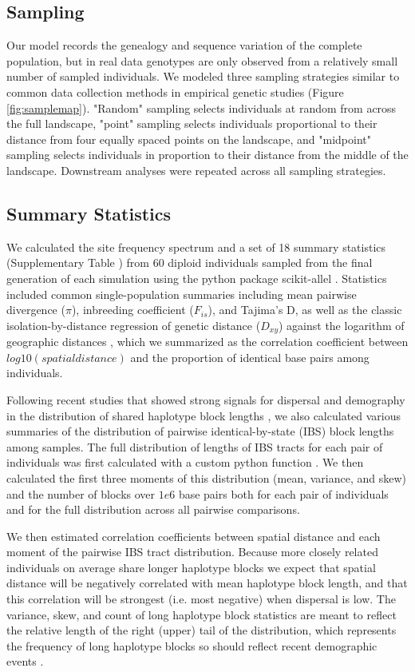 \documentclass[10pt,twoside,lineno]{gsajnl}
\newif\ifcomments
\newcommand{\cjb}[1]{\ifcomments{{\color{blue} \it (#1)}}\else{}\fi}
\newcommand{\ak}[1]{\ifcomments{{\color{red} \it (#1)}}\else{}\fi}
\begin{document}
\subsection{Sampling}
Our model records the genealogy and sequence variation of the complete population, but in real data genotypes are only observed from a relatively small number of sampled individuals. We modeled three sampling strategies similar to common data collection methods in empirical genetic studies (Figure \ref{fig:samplemap}). "Random" sampling selects individuals at random from across the full landscape, "point" sampling selects individuals proportional to their distance from four equally spaced points on the landscape, and "midpoint" sampling selects individuals in proportion to their distance from the middle of the landscape. Downstream analyses were repeated across all sampling strategies. 

\subsection{Summary Statistics}
We calculated the site frequency spectrum and a set of 18 summary statistics (Supplementary Table \cjb{working on this}) from 60 diploid individuals sampled from the final generation of each simulation using the python package scikit-allel \citep{Miles2017}. Statistics included common single-population summaries including mean pairwise divergence ($\pi$), inbreeding coefficient ($F_{is}$), and Tajima's D, as well as the classic isolation-by-distance regression of genetic distance ($D_{xy}$) against the logarithm of geographic distances \citep{Rousset1997}, which we summarized as the correlation coefficient between $log10(spatial distance)$ and the proportion of identical base pairs among individuals. 

Following recent studies that showed strong signals for dispersal and demography in the distribution of shared haplotype block lengths \citep{Ringbauer2017,Baharian2016}, we also calculated various summaries of the distribution of pairwise identical-by-state (IBS) block lengths among samples. The full distribution of lengths of IBS tracts for each pair of individuals was first calculated with a custom python function \ak{point to code on github}. We then calculated the first three moments of this distribution (mean, variance, and skew) and the number of blocks over $1e6$ base pairs both for each pair of individuals and for the full distribution across all pairwise comparisons. 

We then estimated correlation coefficients between spatial distance and each moment of the pairwise IBS tract distribution. Because more closely related individuals on average share longer haplotype blocks we expect that spatial distance will be negatively correlated with mean haplotype block length, and that this correlation will be strongest (i.e. most negative) when dispersal is low. The variance, skew, and count of long haplotype block statistics are meant to reflect the relative length of the right (upper) tail of the distribution, which represents the frequency of long haplotype blocks so should reflect recent demographic events \citep{Ringbauer2017}. 
\end{document}
